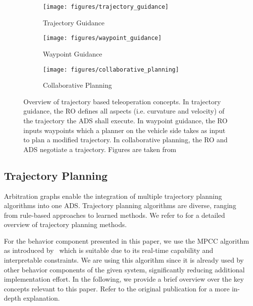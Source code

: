 \begin{figure*}[hbp]
    \centering 
    \begin{subfigure}{0.33\textwidth}
        \texttt{[image: figures/trajectory\_guidance]}
        \\[-0.3 cm]
        \caption{Trajectory Guidance}
        \label{fig:tg}
    \end{subfigure}%
    \hfill
    \begin{subfigure}{0.33\textwidth}
        \texttt{[image: figures/waypoint\_guidance]}
        \\[-0.3 cm]
        \caption{Waypoint Guidance}
        \label{fig:wg}
    \end{subfigure}%
    \hfill
    \begin{subfigure}{0.33\textwidth}
        \texttt{[image: figures/collaborative\_planning]}
        \\[-0.3 cm]
        \caption{Collaborative Planning}
        \label{fig:cp}
    \end{subfigure}
    \caption{Overview of trajectory based teleoperation concepts. In trajectory guidance, the \gls{RO} defines all aspects (i.e. curvature and velocity) of the trajectory the \gls{ADS} shall execute. In waypoint guidance, the \gls{RO} inputs waypoints which a planner on the vehicle side takes as input to plan a modified trajectory. In collaborative planning, the \gls{RO} and \gls{ADS} negotiate a trajectory. Figures are taken from~\cite{Brecht2024EvaluationOfConcepts}}
    \label{fig:test}
\end{figure*}

\subsection{Trajectory Planning}

Arbitration graphs enable the integration of multiple trajectory planning algorithms into one \gls{ADS}.
Trajectory planning algorithms are diverse, ranging from rule-based approaches to learned methods.
We refer to \textcite{schwartingPlanningDecisionMakingAutonomous2018} for a detailed overview of trajectory planning methods.

For the  behavior component presented in this paper, we use the \gls{MPCC} algorithm as introduced by~\textcite{paulsRealtimeCooperativeMotion2022} which is suitable due to its real-time capability and interpretable constraints.
We are using this algorithm since it is already used by other behavior components of the given system, significantly reducing additional implementation effort.
In the following, we provide a brief overview over the key concepts relevant to this paper.
Refer to the original publication for a more in-depth explanation.

